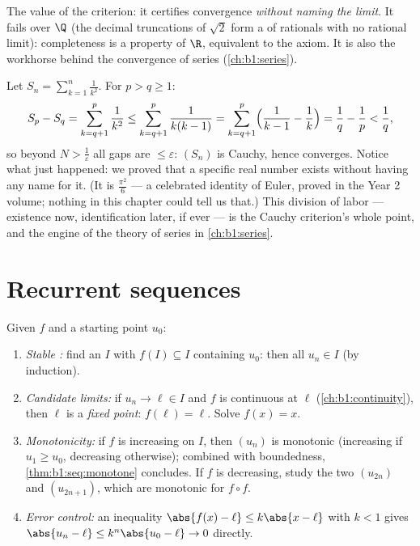 \begin{remark}
The value of the criterion: it certifies convergence \emph{without
naming the limit}. It fails over $\Q$ (the decimal truncations of
$\sqrt 2$ form a  of rationals with no rational
limit): completeness is a property of $\R$, equivalent to the  axiom. It is also the workhorse behind the convergence of
series (\cref{ch:b1:series}).
\end{remark}

\begin{example}\label{ex:b1:seq:basel}
Let $S_n = \sum_{k=1}^{n} \frac{1}{k^2}$. For $p > q \geq 1$:
\[
S_p - S_q = \sum_{k=q+1}^{p} \frac{1}{k^2}
\leq \sum_{k=q+1}^{p} \frac{1}{k(k-1)}
= \sum_{k=q+1}^{p} \Bigl(\frac{1}{k-1} - \frac 1k\Bigr)
= \frac 1q - \frac 1p < \frac 1q ,
\]
so beyond $N > \frac1\varepsilon$ all gaps are $\leq \varepsilon$:
$(S_n)$ is Cauchy, hence converges. Notice what just happened: we
proved that a specific real number exists without having any name
for it. (It is $\frac{\pi^2}{6}$ --- a celebrated identity of
Euler, proved in the Year 2 volume; nothing in this chapter could
tell us that.) This division of labor --- existence now,
identification later, if ever --- is the Cauchy criterion's whole
point, and the engine of the theory of series in
\cref{ch:b1:series}.
\end{example}

\section{Recurrent sequences}

\begin{method}[Studying $u_{n+1} = f(u_n)$]\label{met:b1:seq:recurrent}
Given $f$ and a starting point $u_0$:
\begin{enumerate}
  \item \emph{Stable :} find an  $I$ with $f(I)
        \subseteq I$ containing $u_0$: then all $u_n \in I$ (by
        induction).
  \item \emph{Candidate limits:} if $u_n \to \ell \in I$ and $f$ is
        continuous at $\ell$ (\cref{ch:b1:continuity}), then $\ell$
        is a \emph{fixed point}: $f(\ell) = \ell$. Solve $f(x) = x$.
  \item \emph{Monotonicity:} if $f$ is increasing on $I$, then
        $(u_n)$ is monotonic (increasing if $u_1 \geq u_0$,
        decreasing otherwise); combined with boundedness,
        \cref{thm:b1:seq:monotone} concludes. If $f$ is decreasing,
        study the two  $(u_{2n})$ and $(u_{2n+1})$,
        which are monotonic for $f \circ f$.
  \item \emph{Error control:} an inequality $\abs{f(x) - \ell} \leq
        k\abs{x - \ell}$ with $k < 1$ gives $\abs{u_n - \ell} \leq
        k^n \abs{u_0 - \ell} \to 0$ directly.
\end{enumerate}
\end{method}

